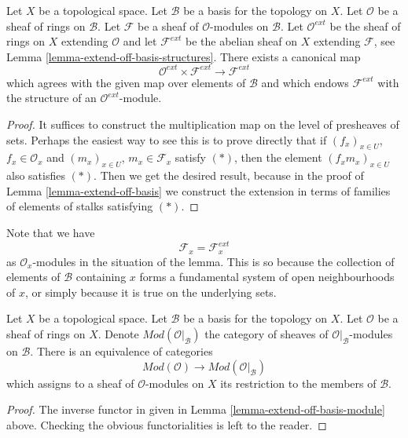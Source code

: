 \begin{lemma}
\label{lemma-extend-off-basis-module}
Let $X$ be a topological space.
Let $\mathcal{B}$ be a basis for the topology on $X$.
Let $\mathcal{O}$ be a sheaf of rings on $\mathcal{B}$.
Let $\mathcal{F}$ be a sheaf of $\mathcal{O}$-modules
on $\mathcal{B}$. Let $\mathcal{O}^{ext}$ be the sheaf
of rings on $X$ extending $\mathcal{O}$ and let
$\mathcal{F}^{ext}$ be the abelian sheaf on $X$ extending
$\mathcal{F}$, see Lemma \ref{lemma-extend-off-basis-structures}.
There exists a canonical map
$$
\mathcal{O}^{ext} \times \mathcal{F}^{ext}
\longrightarrow
\mathcal{F}^{ext}
$$
which agrees with the given map over elements of $\mathcal{B}$
and which endows $\mathcal{F}^{ext}$ with the structure
of an $\mathcal{O}^{ext}$-module.
\end{lemma}

\begin{proof}
It suffices to construct the multiplication map
on the level of presheaves of sets. Perhaps the easiest
way to see this is to prove directly that if
$(f_x)_{x \in U}$, $f_x \in \mathcal{O}_x$
and
$(m_x)_{x \in U}$, $m_x \in \mathcal{F}_x$
satisfy $(*)$, then the element
$(f_xm_x)_{x \in U}$ also satisfies $(*)$.
Then we get the desired result, because in the proof
of Lemma \ref{lemma-extend-off-basis} we construct the extension
in terms of families of elements of stalks satisfying $(*)$.
\end{proof}

\noindent
Note that we have
$$
\mathcal{F}_x = \mathcal{F}_x^{ext}
$$
as $\mathcal{O}_x$-modules in the situation of the lemma.
This is so because the collection of elements of $\mathcal{B}$ containing
$x$ forms a fundamental system of open neighbourhoods of $x$, or
simply because it is true on the underlying sets.

\begin{lemma}
\label{lemma-restrict-basis-equivalence-modules}
Let $X$ be a topological space.
Let $\mathcal{B}$ be a basis for the topology on $X$.
Let $\mathcal{O}$ be a sheaf of rings on $X$.
Denote $\textit{Mod}(\mathcal{O}|_\mathcal{B})$ the category of
sheaves of $\mathcal{O}|_\mathcal{B}$-modules on $\mathcal{B}$.
There is an equivalence of categories
$$
\textit{Mod}(\mathcal{O})
\longrightarrow
\textit{Mod}(\mathcal{O}|_\mathcal{B})
$$
which assigns to a sheaf of $\mathcal{O}$-modules on $X$ its restriction to
the members of $\mathcal{B}$.
\end{lemma}

\begin{proof}
The inverse functor in given in
Lemma \ref{lemma-extend-off-basis-module} above.
Checking the obvious functorialities is left to the reader.
\end{proof}

